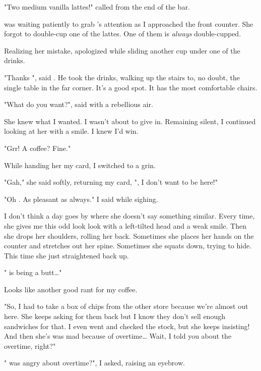 "Two medium vanilla lattes!" \april{} called from the end of the bar.
\VV


\noindent
\dameon{} was waiting patiently to grab \april's attention
as I approached the front counter.
She forgot to double-cup one of the lattes.
One of them is \textit{always} double-cupped.
\VV


\noindent
Realizing her mistake, \april{} apologized while sliding another cup
under one of the drinks.
\VV


"Thanks \april", said \dameon{}.
He took the drinks, walking up the stairs to, no doubt, the single table
in the far corner.  It's a good spot. It has the most comfortable chairs.
\VV


"What do you want?", \april{} said with a rebellious air.
\VV


\noindent
She knew what I wanted. I wasn't about to give in.
Remaining silent, I continued looking at her with a smile.
I knew I'd win.
\VV


"Grr! A coffee? Fine."
\VV


\noindent
While handing her my card, I switched to a grin.
\VV


"Gah," she said softly, returning my card, "\josh, I don't want to be here!"


"Oh \april. As pleasant as always."  I said while sighing.
\VV


\noindent
I don't think a day goes by where she doesn't say something similar.
Every time, she gives me this odd look look with a left-tilted head
and a weak smile.  Then she drops her shoulders, rolling her back.
Sometimes she places her hands on the counter and stretches out her spine.
Sometimes she squats down, trying to hide.
This time she just straightened back up.
\VV


"\jasmine{} is being a butt\ldots"
\VV


\noindent
Looks like another good rant for my coffee.
\VV


"So, I had to take a box of chips from the other store
because we're almost out here.  She keeps asking for them back
but I know they don't sell enough sandwiches for that.
I even went and checked the stock, but she keeps insisting!
And then she's was mad because of overtime\ldots{}
Wait, I told you about the overtime, right?"
\VV


"\jasmine{} was angry about overtime?", I asked, raising an eyebrow.
\VV


